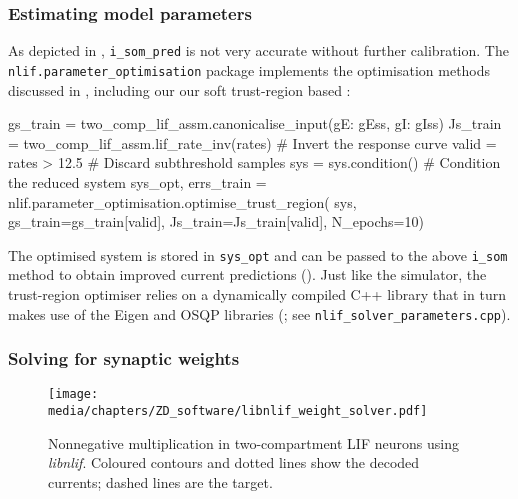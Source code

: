 \subsubsection{Estimating model parameters}
As depicted in , \texttt{i\_som\_pred} is not very accurate without further calibration.
The \texttt{nlif.parameter\_optimisation} package implements the optimisation methods discussed in , including our 
our soft trust-region based \SQP:
\begin{pythoncode}
gs_train = two_comp_lif_assm.canonicalise_input({gE: gEss, gI: gIss})
Js_train = two_comp_lif_assm.lif_rate_inv(rates) # Invert the response curve
valid = rates > 12.5                             # Discard subthreshold samples
sys = sys.condition()                            # Condition the reduced system
sys_opt, errs_train = nlif.parameter_optimisation.optimise_trust_region(
	sys, gs_train=gs_train[valid], Js_train=Js_train[valid], N_epochs=10)
\end{pythoncode}
The optimised system is stored in \texttt{sys\_opt} and can be passed to the above \texttt{i\_som} method to obtain improved current predictions ().
Just like the \nlif simulator, the trust-region optimiser relies on a dynamically compiled C++ library that in turn makes use of the Eigen and OSQP libraries (\cite{stellato2020osqp}; see \texttt{nlif\_solver\_parameters.cpp}).

\subsubsection{Solving for synaptic weights}

\begin{figure}
	\texttt{[image: media/chapters/ZD\_software/libnlif\_weight\_solver.pdf]}
	\caption[Nonnegative multiplication in two-compartment LIF neurons using \emph{libnlif}]{Nonnegative multiplication in two-compartment LIF neurons using \emph{libnlif}. Coloured contours and dotted lines show the decoded currents; dashed lines are the target.}
\end{figure}

